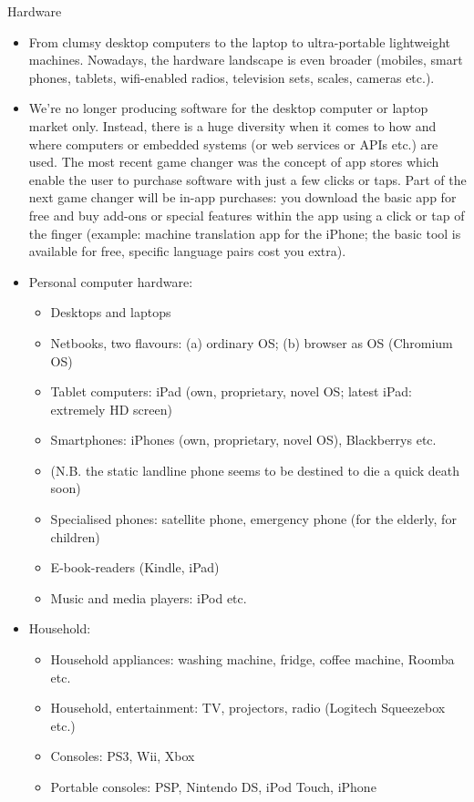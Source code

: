 \documentclass[10pt, plain]{../../metanetpaper}
\begin{document}
\begin{multicols}{2}
Hardware

\begin{itemize}
\item From clumsy desktop computers to the laptop to ultra-portable lightweight machines. Nowadays, the hardware landscape is even broader (mobiles, smart phones, tablets, wifi-enabled radios, television sets, scales, cameras etc.).
\item We’re no longer producing software for the desktop computer or laptop market only. Instead, there is a huge diversity when it comes to how and where computers or embedded systems (or web services or APIs etc.) are used. The most recent game changer was the concept of app stores which enable the user to purchase software with just a few clicks or taps. Part of the next game changer will be in-app purchases: you download the basic app for free and buy add-ons or special features within the app using a click or tap of the finger (example: machine translation app for the iPhone; the basic tool is available for free, specific language pairs cost you extra).
\item Personal computer hardware: 
  \begin{itemize}
  \item Desktops and laptops
  \item Netbooks, two flavours: (a) ordinary OS; (b) browser as OS (Chromium OS)
  \item Tablet computers: iPad (own, proprietary, novel OS; latest iPad: extremely HD screen)
  \item Smartphones: iPhones (own, proprietary, novel OS), Blackberrys etc.
  \item (N.B. the static landline phone seems to be destined to die a quick death soon)
  \item Specialised phones: satellite phone, emergency phone (for the elderly, for children)
  \item E-book-readers (Kindle, iPad)
  \item Music and media players: iPod etc.
  \end{itemize}
\item Household:
  \begin{itemize}
  \item Household appliances: washing machine, fridge, coffee machine, Roomba etc.
  \item Household, entertainment: TV, projectors, radio (Logitech Squeezebox etc.)
  \item Consoles: PS3, Wii, Xbox
  \item Portable consoles: PSP, Nintendo DS, iPod Touch, iPhone

\end{itemize}
\end{itemize}
\end{multicols}
\end{document}
